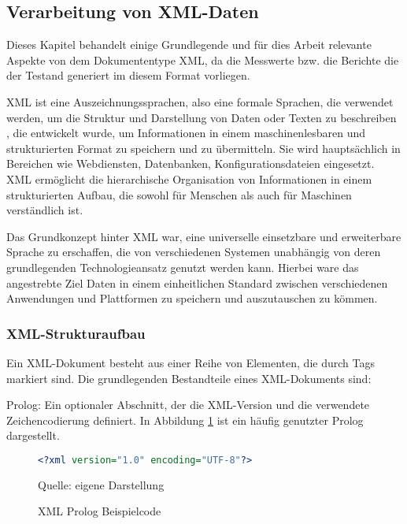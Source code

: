 \subsection{Verarbeitung von XML-Daten}
\label{subsec:verarbeitung-von-xml-daten}

Dieses Kapitel behandelt einige Grundlegende und für dies Arbeit relevante Aspekte von dem Dokumententype \ac{XML},
da die Messwerte bzw. die Berichte die der Testand generiert im diesem Format vorliegen.


\ac{XML} ist eine Auszeichnungssprachen, also eine
formale Sprachen, die verwendet werden, um die Struktur und Darstellung von Daten oder Texten zu beschreiben \cite*{Neu},
die entwickelt wurde, um Informationen in einem maschinenlesbaren und strukturierten Format zu speichern und zu übermitteln.
Sie wird hauptsächlich in Bereichen wie Webdiensten, Datenbanken, Konfigurationsdateien eingesetzt.
\ac{XML} ermöglicht die hierarchische Organisation von Informationen in einem strukturierten Aufbau, die sowohl für Menschen
als auch für Maschinen verständlich ist.

Das Grundkonzept hinter \ac{XML} war, eine universelle einsetzbare und erweiterbare Sprache zu erschaffen, die von verschiedenen Systemen
unabhängig von deren grundlegenden Technologieansatz genutzt werden kann.
Hierbei ware das angestrebte Ziel Daten in einem einheitlichen Standard zwischen verschiedenen Anwendungen und Plattformen zu speichern und auszutauschen
zu kömmen.

\subsubsection{XML-Strukturaufbau}

Ein \ac{XML}-Dokument besteht aus einer Reihe von Elementen, die durch Tags markiert sind.
Die grundlegenden Bestandteile eines \ac{XML}-Dokuments sind:

Prolog: Ein optionaler Abschnitt, der die \ac{XML}-Version und die verwendete Zeichencodierung definiert.
In Abbildung \ref{fig:XML Prolog Beispielcode} ist ein häufig genutzter Prolog dargestellt.

\begin{figure}[H]
\centering
\begin{minipage}{0.95\textwidth}
\begin{lstlisting}[language=XML]
<?xml version="1.0" encoding="UTF-8"?>
\end{lstlisting}
\end{minipage}
\caption{XML Prolog Beispielcode}
\label{fig:XML Prolog Beispielcode}
    {Quelle: eigene Darstellung}
\end{figure}

